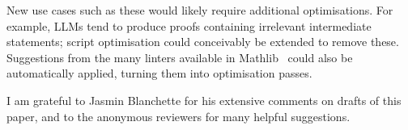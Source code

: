 \documentclass[sigplan,screen]{acmart}
\begin{document}
New use cases such as these would likely require additional optimisations.
For example, LLMs tend to produce proofs containing irrelevant intermediate statements;
script optimisation could conceivably be extended to remove these.
Suggestions from the many linters available in Mathlib~\cite{vanDoorn2020} could also be automatically applied, turning them into optimisation passes.

\begin{acks}
  I am grateful to Jasmin Blanchette for his extensive comments on drafts of this paper, and to the anonymous reviewers for many helpful suggestions.
\end{acks}


\end{document}
